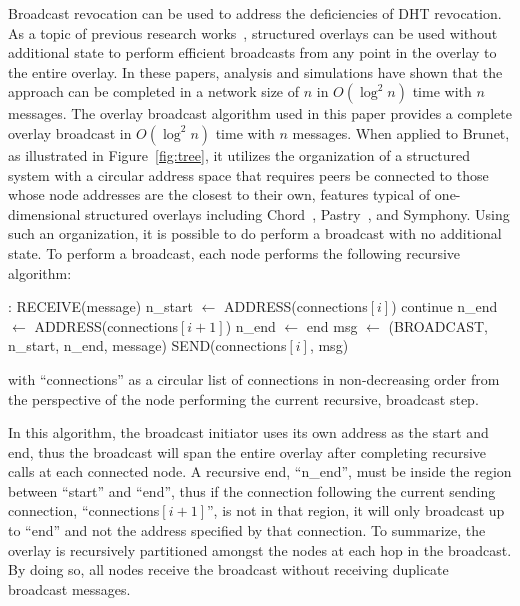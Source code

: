 Broadcast revocation can be used to address the deficiencies of DHT revocation.
As a topic of previous research works~\cite{broadcast, chord_broadcast},
structured overlays can be used without additional state to perform efficient
broadcasts from any point in the overlay to the entire overlay.  In these
papers, analysis and simulations have shown that the approach can be completed
in a network size of $n$ in $O(\log^2 n)$ time with $n$ messages.  The overlay
broadcast algorithm used in this paper provides a complete overlay broadcast in
$O(\log^2 n)$ time with $n$ messages.  When applied to Brunet, as illustrated
in Figure~\ref{fig:tree}, it utilizes the organization of a structured system
with a circular address space that requires peers be connected to those whose
node addresses are the closest to their own, features typical of
one-dimensional structured overlays including Chord~\cite{chord},
Pastry~\cite{pastry}, and Symphony.  Using such an organization, it is possible
to do perform a broadcast with no additional state.  To perform a broadcast,
each node performs the following recursive algorithm:

\begin{algorithmic}
:
  \STATE RECEIVE(message)
    \STATE n\_start $\gets$ ADDRESS(connections$[i]$)
    \IF {n\_start $\not\in$ $[$start, end$)$}
      \STATE continue
    \ENDIF
    \STATE n\_end $\gets$ ADDRESS(connections$[i+1]$)
    \IF {n\_end $\not\in$ $[$start, end$)$}
      \STATE n\_end $\gets$ end
    \ENDIF
    \STATE msg $\gets$ (BROADCAST, n\_start, n\_end, message)
    \STATE SEND(connections$[i]$, msg)
  \ENDFOR
\end{algorithmic}
with ``connections'' as a circular list of connections in non-decreasing order
from the perspective of the node performing the current recursive, broadcast
step.

In this algorithm, the broadcast initiator uses its own address as the start
and end, thus the broadcast will span the entire overlay after completing
recursive calls at each connected node.  A recursive end, ``n\_end'', must be
inside the region between ``start'' and ``end'', thus if the connection
following the current sending connection, ``connections$[i+1]$'', is not in
that region, it will only broadcast up to ``end'' and not the address specified
by that connection.  To summarize, the overlay is recursively partitioned
amongst the nodes at each hop in the broadcast.  By doing so, all nodes receive
the broadcast without receiving duplicate broadcast messages.
